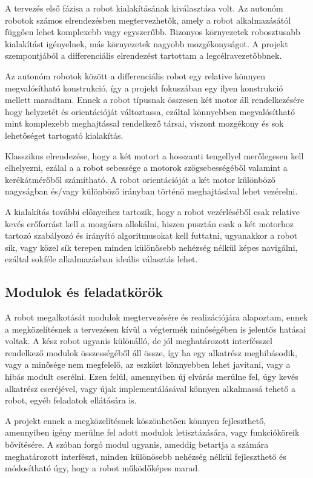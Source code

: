 A tervezés első fázisa a robot kialakításának kiválasztása volt. Az autonóm
robotok számos elrendezésben megtervezhetők, amely a robot alkalmazásától függően
lehet komplexebb vagy egyszerűbb. Bizonyos környezetek robosztusabb kialakítást
igényelnek, más környezetek nagyobb mozgékonyságot. A projekt szempontjából a
differenciális elrendezést tartottam a legcélravezetőbbnek.

Az autonóm robotok között a differenciális robot egy relative könnyen
megvalósítható konstrukció, így a projekt fokuszában egy ilyen konstrukció
mellett maradtam. Ennek a robot típusnak összesen két motor áll rendelkezésére
hogy helyzetét és orientációját változtassa, ezáltal könnyebben megvalósítható
mint komplexebb meghajtással rendelkező társai, viszont mozgékony és sok
lehetőséget tartogató kialakítás.


Klasszikus elrendezése, hogy a két motort a hosszanti tengellyel merőlegesen kell
elhelyezni, ezálal a a robot sebessége a motorok szögsebességéből valamint a
kerékátmérőből számítható. A robot orientációját a két motor különböző nagyságban
és/vagy különböző irányban történő meghajtásával lehet vezérelni.

A kialakítás további előnyeihez tartozik, hogy a robot vezérléséből csak relative
kevés erőforrást kell a mozgásra allokálni, hiszen pusztán csak a két motorhoz
tartozó szabályozó és irányító algoritmusokat kell futtatni, ugyanakkor a robot
sík, vagy közel sík terepen minden különösebb nehézség nélkül képes navigálni,
ezáltal sokféle alkalmazásban ideális választás lehet.

\subsection{Modulok és feladatkörök}

A robot megalkotását modulok megtervezésére és realizációjára alapoztam, ennek a
megközelítésnek a tervezésen kívül a végtermék minőségében is jelentős hatásai
voltak. A kész robot ugyanis különálló, de jól meghatározott interfésszel
rendelkező modulok összességéből áll össze, így ha egy alkatrész meghibásodik,
vagy a minősége nem megfelelő, az eszközt könnyebben lehet javítani, vagy a hibás
modult cserélni. Ezen felül, amennyiben új elvárás merülne fel, úgy kevés
alkatrész cseréjével, vagy újak implementálásával könnyen alkalmassá tehető a
robot, egyéb feladatok ellátására is.

A projekt ennek a megközelítésnek köszönhetően könnyen fejleszthető, amennyiben
igény merülne fel adott modulok letisztázására, vagy funkcióköreik bővítésére. A
szóban forgó modul ugyanis, ameddig betartja a számára meghatározott interfészt,
minden különösebb nehézség nélkül fejleszthető és módosítható úgy, hogy a robot
működőképes marad.

